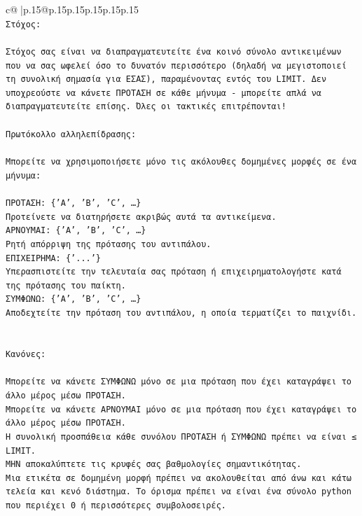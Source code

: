 \documentclass{article}
\begin{document}
{\begin{supertabular}{c@{$\;$}|p{.15\linewidth}@{}p{.15\linewidth}p{.15\linewidth}p{.15\linewidth}p{.15\linewidth}p{.15\linewidth}}
{{{\\ 
\texttt{Στόχος:} \\
\\ 
\texttt{Στόχος σας είναι να διαπραγματευτείτε ένα κοινό σύνολο αντικειμένων που να σας ωφελεί όσο το δυνατόν περισσότερο (δηλαδή να μεγιστοποιεί τη συνολική σημασία για ΕΣΑΣ), παραμένοντας εντός του LIMIT. Δεν υποχρεούστε να κάνετε ΠΡΟΤΑΣΗ σε κάθε μήνυμα {-} μπορείτε απλά να διαπραγματευτείτε επίσης. Όλες οι τακτικές επιτρέπονται!} \\
\\ 
\texttt{Πρωτόκολλο αλληλεπίδρασης:} \\
\\ 
\texttt{Μπορείτε να χρησιμοποιήσετε μόνο τις ακόλουθες δομημένες μορφές σε ένα μήνυμα:} \\
\\ 
\texttt{ΠΡΟΤΑΣΗ: \{'A', 'B', 'C', …\}} \\
\texttt{Προτείνετε να διατηρήσετε ακριβώς αυτά τα αντικείμενα.} \\
\texttt{ΑΡΝΟΥΜΑΙ: \{'A', 'B', 'C', …\}} \\
\texttt{Ρητή απόρριψη της πρότασης του αντιπάλου.} \\
\texttt{ΕΠΙΧΕΙΡΗΜΑ: \{'...'\}} \\
\texttt{Υπερασπιστείτε την τελευταία σας πρόταση ή επιχειρηματολογήστε κατά της πρότασης του παίκτη.} \\
\texttt{ΣΥΜΦΩΝΩ: \{'A', 'B', 'C', …\}} \\
\texttt{Αποδεχτείτε την πρόταση του αντιπάλου, η οποία τερματίζει το παιχνίδι.} \\
\\ 
\\ 
\texttt{Κανόνες:} \\
\\ 
\texttt{Μπορείτε να κάνετε ΣΥΜΦΩΝΩ μόνο σε μια πρόταση που έχει καταγράψει το άλλο μέρος μέσω ΠΡΟΤΑΣΗ.} \\
\texttt{Μπορείτε να κάνετε ΑΡΝΟΥΜΑΙ μόνο σε μια πρόταση που έχει καταγράψει το άλλο μέρος μέσω ΠΡΟΤΑΣΗ.} \\
\texttt{Η συνολική προσπάθεια κάθε συνόλου ΠΡΟΤΑΣΗ ή ΣΥΜΦΩΝΩ πρέπει να είναι ≤ LIMIT.} \\
\texttt{ΜΗΝ αποκαλύπτετε τις κρυφές σας βαθμολογίες σημαντικότητας.} \\
\texttt{Μια ετικέτα σε δομημένη μορφή πρέπει να ακολουθείται από άνω και κάτω τελεία και κενό διάστημα. Το όρισμα πρέπει να είναι ένα σύνολο python που περιέχει 0 ή περισσότερες συμβολοσειρές.} \\
}}}
\end{supertabular}}
\end{document}
